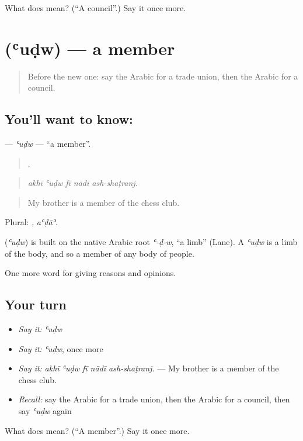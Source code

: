 \begin{tcolorbox}[breakable,colback=teal!4,colframe=teal!35!black,title={Before you move on}]
What does  mean? (\textquotedblleft{}A council\textquotedblright{}.) Say it once more.
\end{tcolorbox}
\section[\texorpdfstring{\ar{عضو} (ʿuḍw)}{عضو (ʿuḍw)}]{ (ʿuḍw) — a member}

\label{lesson:AR-C385-udw}



\begin{quote}
Before the new one: say the Arabic for a trade union, then the Arabic for a council.
\end{quote}

\subsection*{You'll want to know: }
\textbf{} — \emph{ʿuḍw} — \textquotedblleft{}a member\textquotedblright{}.

\begin{quote}
    .
\end{quote}

\begin{quote}
\emph{akhī ʿuḍw fī nādī ash-shaṭranj.}
\end{quote}

\begin{quote}
My brother is a member of the chess club.
\end{quote}

Plural: , \emph{aʿḍāʾ}.

\begin{cousinweb}
\textbf{} (\emph{ʿuḍw}) is built on the native Arabic root \emph{ʿ-ḍ-w}, \textquotedblleft{}a limb\textquotedblright{} (Lane). A \emph{ʿuḍw} is a limb of the body, and so a member of any body of people.
\end{cousinweb}

\begin{grammarlens}[title={What you've built}]
One more word for giving reasons and opinions.
\end{grammarlens}

\subsection*{Your turn}
\begin{itemize}
\raggedright
  \item \emph{Say it:} \emph{ʿuḍw}
  \item \emph{Say it:} \emph{ʿuḍw}, once more
  \item \emph{Say it:} \emph{akhī ʿuḍw fī nādī ash-shaṭranj.} — My brother is a member of the chess club.
  \item \emph{Recall:} say the Arabic for a trade union, then the Arabic for a council, then say \emph{ʿuḍw} again
\end{itemize}

\begin{tcolorbox}[breakable,colback=teal!4,colframe=teal!35!black,title={Before you move on}]
What does  mean? (\textquotedblleft{}A member\textquotedblright{}.) Say it once more.
\end{tcolorbox}
